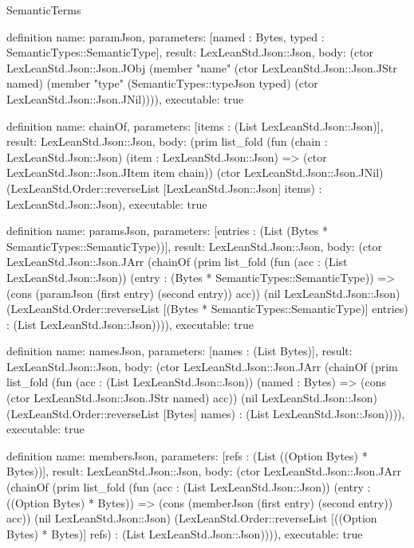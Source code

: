 \begin{lexlean}{SemanticTerms}
\begin{semanticmodule}
definition{
  name: paramJson,
  parameters: [named : Bytes, typed : SemanticTypes::SemanticType],
  result: LexLeanStd.Json::Json,
  body: (ctor LexLeanStd.Json::Json.JObj (member "name" (ctor LexLeanStd.Json::Json.JStr named) (member "type" (SemanticTypes::typeJson typed) (ctor LexLeanStd.Json::Json.JNil)))),
  executable: true
}

definition{
  name: chainOf,
  parameters: [items : (List LexLeanStd.Json::Json)],
  result: LexLeanStd.Json::Json,
  body: (prim list_fold (fun (chain : LexLeanStd.Json::Json) (item : LexLeanStd.Json::Json) => (ctor LexLeanStd.Json::Json.JItem item chain)) (ctor LexLeanStd.Json::Json.JNil) (LexLeanStd.Order::reverseList [LexLeanStd.Json::Json] items) : LexLeanStd.Json::Json),
  executable: true
}

definition{
  name: paramsJson,
  parameters: [entries : (List (Bytes * SemanticTypes::SemanticType))],
  result: LexLeanStd.Json::Json,
  body: (ctor LexLeanStd.Json::Json.JArr (chainOf (prim list_fold (fun (acc : (List LexLeanStd.Json::Json)) (entry : (Bytes * SemanticTypes::SemanticType)) => (cons (paramJson (first entry) (second entry)) acc)) (nil LexLeanStd.Json::Json) (LexLeanStd.Order::reverseList [(Bytes * SemanticTypes::SemanticType)] entries) : (List LexLeanStd.Json::Json)))),
  executable: true
}

definition{
  name: namesJson,
  parameters: [names : (List Bytes)],
  result: LexLeanStd.Json::Json,
  body: (ctor LexLeanStd.Json::Json.JArr (chainOf (prim list_fold (fun (acc : (List LexLeanStd.Json::Json)) (named : Bytes) => (cons (ctor LexLeanStd.Json::Json.JStr named) acc)) (nil LexLeanStd.Json::Json) (LexLeanStd.Order::reverseList [Bytes] names) : (List LexLeanStd.Json::Json)))),
  executable: true
}

definition{
  name: membersJson,
  parameters: [refs : (List ((Option Bytes) * Bytes))],
  result: LexLeanStd.Json::Json,
  body: (ctor LexLeanStd.Json::Json.JArr (chainOf (prim list_fold (fun (acc : (List LexLeanStd.Json::Json)) (entry : ((Option Bytes) * Bytes)) => (cons (memberJson (first entry) (second entry)) acc)) (nil LexLeanStd.Json::Json) (LexLeanStd.Order::reverseList [((Option Bytes) * Bytes)] refs) : (List LexLeanStd.Json::Json)))),
  executable: true
}


\end{semanticmodule}
\end{lexlean}
